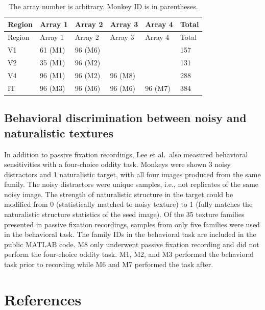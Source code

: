 \documentclass[
  11pt,
  letterpaper,
  DIV=11,
  numbers=noendperiod]{scrartcl}
\begin{document}
\begin{longtable}[]{@{}llllll@{}}
\caption{The array number is arbitrary. Monkey ID is in
parentheses.}\label{tbl-sites}\tabularnewline
\toprule\noalign{}
Region & Array 1 & Array 2 & Array 3 & Array 4 & Total \\
\midrule\noalign{}
\endfirsthead
\toprule\noalign{}
Region & Array 1 & Array 2 & Array 3 & Array 4 & Total \\
\midrule\noalign{}
\endhead
\bottomrule\noalign{}
\endlastfoot
V1 & 61 (M1) & 96 (M6) & & & 157 \\
V2 & 35 (M1) & 96 (M2) & & & 131 \\
V4 & 96 (M1) & 96 (M2) & 96 (M8) & & 288 \\
IT & 96 (M3) & 96 (M6) & 96 (M6) & 96 (M7) & 384 \\
\end{longtable}

\subsection{Behavioral discrimination between noisy and naturalistic
textures}\label{behavioral-discrimination-between-noisy-and-naturalistic-textures}

In addition to passive fixation recordings, Lee et al.~also measured
behavioral sensitivities with a four-choice oddity task. Monkeys were
shown 3 noisy distractors and 1 naturalistic target, with all four
images produced from the same family. The noisy distractors were unique
samples, i.e., not replicates of the same noisy image. The strength of
naturalistic structure in the target could be modified from 0
(statistically matched to noisy texture) to 1 (fully matches the
naturalistic structure statistics of the seed image). Of the 35 texture
families presented in passive fixation recordings, samples from only
five families were used in the behavioral task. The family IDs in the
behavioral task are included in the public MATLAB code. M8 only
underwent passive fixation recording and did not perform the four-choice
oddity task. M1, M2, and M3 performed the behavioral task prior to
recording while M6 and M7 performed the task after.

\section{References}\label{references}
\end{document}
